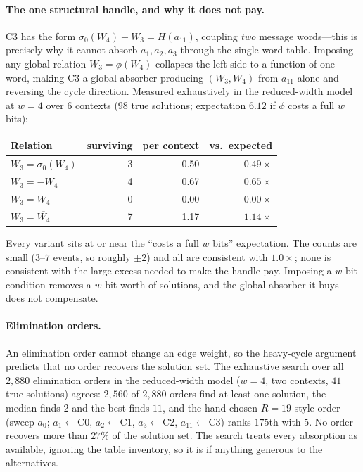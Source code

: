 \documentclass[11pt,a4paper]{article}
\newcommand{\sig}[1]{\sigma_{#1}}
\begin{document}
\paragraph{The one structural handle, and why it does not pay.}
C3 has the form $\sig{0}(W_4)+W_3 = H(a_{11})$, coupling \emph{two} message
words---this is precisely why it cannot absorb $a_1,a_2,a_3$ through the
single-word table.  Imposing any global relation $W_3=\phi(W_4)$ collapses the
left side to a function of one word, making C3 a global absorber producing
$(W_3,W_4)$ from $a_{11}$ alone and reversing the cycle direction.  Measured
exhaustively in the reduced-width model at $w=4$ over 6 contexts (98 true
solutions; expectation $6.12$ if $\phi$ costs a full $w$ bits):

\begin{center}
\begin{tabular}{@{}lrrr@{}}
\toprule
Relation & surviving & per context & vs.\ expected \\
\midrule
$W_3=\sig{0}(W_4)$ & 3 & 0.50 & $0.49\times$ \\
$W_3=-W_4$         & 4 & 0.67 & $0.65\times$ \\
$W_3=W_4$          & 0 & 0.00 & $0.00\times$ \\
$W_3=\overline{W_4}$ & 7 & 1.17 & $1.14\times$ \\
\bottomrule
\end{tabular}
\end{center}

Every variant sits at or near the ``costs a full $w$ bits'' expectation.  The
counts are small ($3$--$7$ events, so roughly $\pm2$) and all are consistent
with $1.0\times$; none is consistent with the large excess needed to make the
handle pay.  Imposing a $w$-bit condition removes a $w$-bit worth of solutions,
and the global absorber it buys does not compensate.

\paragraph{Elimination orders.}
An elimination order cannot change an edge weight, so the heavy-cycle
argument predicts that no order recovers the solution set.  The exhaustive
search over all $2{,}880$ elimination orders in the reduced-width model
($w{=}4$, two contexts, $41$ true solutions) agrees: $2{,}560$ of
$2{,}880$ orders find at least one solution, the median finds $2$ and the
best finds $11$, and the hand-chosen $R{=}19$-style order (sweep $a_0$;
$a_1\leftarrow$C0, $a_2\leftarrow$C1, $a_3\leftarrow$C2,
$a_{11}\leftarrow$C3) ranks $175$th with $5$.  No order recovers more than
$27\%$ of the solution set.  The search treats every absorption as
available, ignoring the table inventory, so it is if anything generous to
the alternatives.
\end{document}

